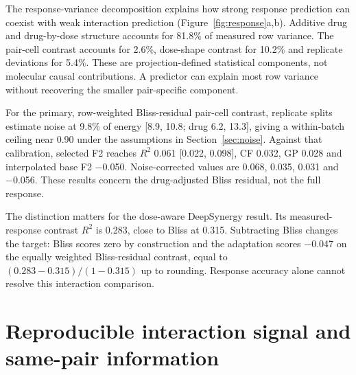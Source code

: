 \documentclass[11pt]{article}
\begin{document}
The response-variance decomposition explains how strong response prediction can coexist with weak interaction prediction (Figure~\ref{fig:response}a,b). Additive drug and drug-by-dose structure accounts for 81.8\% of measured row variance. The pair-cell contrast accounts for 2.6\%, dose-shape contrast for 10.2\% and replicate deviations for 5.4\%. These are projection-defined statistical components, not molecular causal contributions. A predictor can explain most row variance without recovering the smaller pair-specific component.

For the primary, row-weighted Bliss-residual pair-cell contrast, replicate splits estimate noise at 9.8\% of energy [8.9, 10.8; drug 6.2, 13.3], giving a within-batch ceiling near 0.90 under the assumptions in Section~\ref{sec:noise}. Against that calibration, selected F2 reaches $R^2$ 0.061 [0.022, 0.098], CF 0.032, GP 0.028 and interpolated base F2 −0.050. Noise-corrected values are 0.068, 0.035, 0.031 and −0.056. These results concern the drug-adjusted Bliss residual, not the full response.

The distinction matters for the dose-aware DeepSynergy result. Its measured-response contrast $R^2$ is 0.283, close to Bliss at 0.315. Subtracting Bliss changes the target: Bliss scores zero by construction and the adaptation scores −0.047 on the equally weighted Bliss-residual contrast, equal to $(0.283-0.315)/(1-0.315)$ up to rounding. Response accuracy alone cannot resolve this interaction comparison.


\section{Reproducible interaction signal and same-pair information}\label{sec:interaction}
\end{document}
